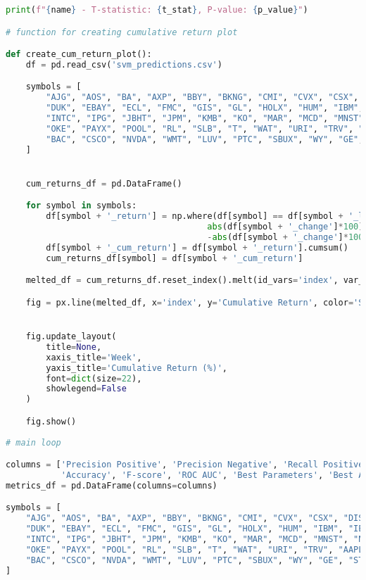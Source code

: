 \begin{lstlisting}[language=Python]
        print(f"{name} - T-statistic: {t_stat}, P-value: {p_value}")

# function for creating cumulative return plot

def create_cum_return_plot():
    df = pd.read_csv('svm_predictions.csv')

    symbols = [
        "AJG", "AOS", "BA", "AXP", "BBY", "BKNG", "CMI", "CVX", "CSX", "DIS",
        "DUK", "EBAY", "ECL", "FMC", "GIS", "GL", "HOLX", "HUM", "IBM", "IEX",
        "INTC", "IPG", "JBHT", "JPM", "KMB", "KO", "MAR", "MCD", "MNST", "NKE", 
        "OKE", "PAYX", "POOL", "RL", "SLB", "T", "WAT", "URI", "TRV", "AAPL", 
        "BAC", "CSCO", "NVDA", "WMT", "LUV", "PTC", "SBUX", "WY", "GE", "STE"
    ]


    cum_returns_df = pd.DataFrame()

    for symbol in symbols:
        df[symbol + '_return'] = np.where(df[symbol] == df[symbol + '_label'], 
                                        abs(df[symbol + '_change']*100), 
                                        -abs(df[symbol + '_change']*100))
        df[symbol + '_cum_return'] = df[symbol + '_return'].cumsum()
        cum_returns_df[symbol] = df[symbol + '_cum_return']

    melted_df = cum_returns_df.reset_index().melt(id_vars='index', var_name='Symbol', value_name='Cumulative Return')

    fig = px.line(melted_df, x='index', y='Cumulative Return', color='Symbol', title='Cumulative Returns of Symbols')


    fig.update_layout(
        title=None,
        xaxis_title='Week',
        yaxis_title='Cumulative Return (%)',
        font=dict(size=22),
        showlegend=False
    )

    fig.show()
    
# main loop

columns = ['Precision Positive', 'Precision Negative', 'Recall Positive', 'Recall Negative',
           'Accuracy', 'F-score', 'ROC AUC', 'Best Parameters', 'Best Accuracy', 'Average Return', 'Std Return']
metrics_df = pd.DataFrame(columns=columns)

symbols = [
    "AJG", "AOS", "BA", "AXP", "BBY", "BKNG", "CMI", "CVX", "CSX", "DIS",
    "DUK", "EBAY", "ECL", "FMC", "GIS", "GL", "HOLX", "HUM", "IBM", "IEX",
    "INTC", "IPG", "JBHT", "JPM", "KMB", "KO", "MAR", "MCD", "MNST", "NKE", 
    "OKE", "PAYX", "POOL", "RL", "SLB", "T", "WAT", "URI", "TRV", "AAPL", 
    "BAC", "CSCO", "NVDA", "WMT", "LUV", "PTC", "SBUX", "WY", "GE", "STE"
]



\end{lstlisting}
